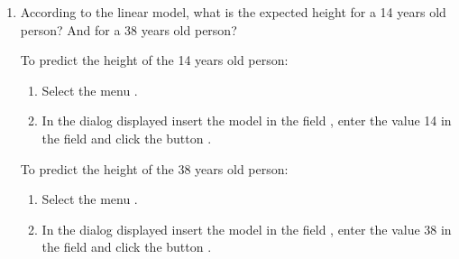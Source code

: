 \begin{enumerate}[leftmargin=*]
\begin{enumerate}
\item According to the linear model, what is the expected height for a 14 years old person? And for a 38 years old
person?
\begin{indication}
To predict the height of the 14 years old person:
\begin{enumerate}
\item Select the menu .
\item In the dialog displayed insert the model  in the field
, enter the value 14 in the field  and click the button .
\end{enumerate}
To predict the height of the 38 years old person:
\begin{enumerate}
\item Select the menu .
\item In the dialog displayed insert the model  in the field
, enter the value 38 in the field  and click the button .
\end{enumerate}
\end{indication}
\end{enumerate}


\end{enumerate}
